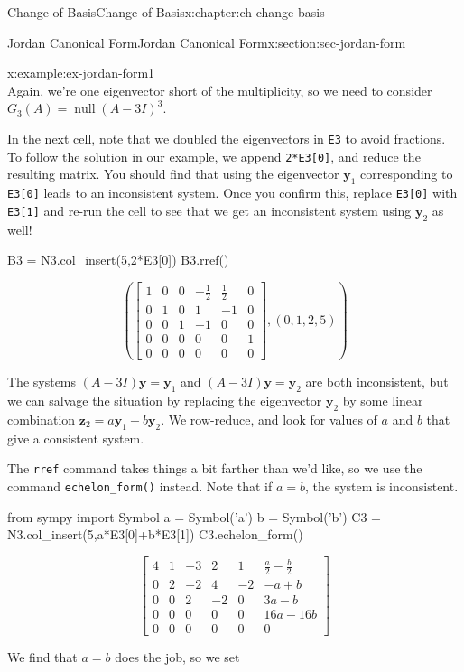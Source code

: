 \documentclass[oneside,10pt,]{book}
\newcommand{\mono}[1]{\texttt{#1}}
\numberwithin{equation}{section}
\newcommand{\bbm}{\begin{bmatrix}}
\newcommand{\ebm}{\end{bmatrix}}
\newcommand{\nll}{\operatorname{null}}
\newcommand{\zz}{\mathbf{z}}
\newcommand{\yy}{\mathbf{y}}
\newcommand{\amp}{&}
\begin{document}
\begin{chapterptx}{Change of Basis}{}{Change of Basis}{}{}{x:chapter:ch-change-basis}
\begin{sectionptx}{Jordan Canonical Form}{}{Jordan Canonical Form}{}{}{x:section:sec-jordan-form}
\begin{example}{}{x:example:ex-jordan-form1}
\begin{equation*}
\end{equation*}
Again, we're one eigenvector short of the multiplicity, so we need to consider \(G_3(A)=\nll(A-3I)^3\).%
\par
In the next cell, note that we doubled the eigenvectors in \mono{E3} to avoid fractions. To follow the solution in our example, we append \mono{2*E3[0]}, and reduce the resulting matrix. You should find that using the eigenvector \(\yy_1\) corresponding to \mono{E3[0]} leads to an inconsistent system. Once you confirm this, replace \mono{E3[0]} with \mono{E3[1]} and re-run the cell to see that we get an inconsistent system using \(\yy_2\) as well!%
\begin{sageinput}
B3 = N3.col_insert(5,2*E3[0])
B3.rref()
\end{sageinput}
\begin{sageoutput}
\[\left(\bbm 1\amp 0\amp 0\amp -\frac12\amp \frac12\amp 0\\0\amp 1\amp 0\amp 1\amp -1\amp 0\\0\amp 0\amp 1\amp -1\amp 0\amp 0\\
0\amp 0\amp 0\amp 0\amp 0\amp 1\\0\amp 0\amp 0\amp 0\amp 0\amp 0\ebm, (0,1,2,5)\right)\]
\end{sageoutput}
The systems \((A-3I)\yy = \yy_1\) and \((A-3I)\yy=\yy_2\) are both inconsistent, but we can salvage the situation by replacing the eigenvector \(\yy_2\) by some linear combination \(\zz_2 = a\yy_1+b\yy_2\). We row-reduce, and look for values of \(a\) and \(b\) that give a consistent system.%
\par
The \mono{rref} command takes things a bit farther than we'd like, so we use the command \mono{echelon\_form()} instead. Note that if \(a=b\), the system is inconsistent.%
\begin{sageinput}
from sympy import Symbol
a = Symbol('a')
b = Symbol('b')
C3 = N3.col_insert(5,a*E3[0]+b*E3[1])
C3.echelon_form()
\end{sageinput}
\begin{sageoutput}
\[\bbm 4\amp 1\amp -3\amp 2\amp 1\amp \frac{a}{2}-\frac{b}{2}\\
0\amp 2\amp -2\amp 4\amp -2\amp-a+b\\
0\amp 0\amp 2\amp -2\amp 0\amp 3a-b\\
0\amp 0\amp 0\amp 0\amp 0\amp 16a-16b\\
0\amp 0\amp 0\amp 0\amp 0\amp 0\ebm\]
\end{sageoutput}
We find that \(a=b\) does the job, so we set%
\begin{equation*}

\end{equation*}
\end{example}
\end{sectionptx}
\end{chapterptx}
\end{document}

